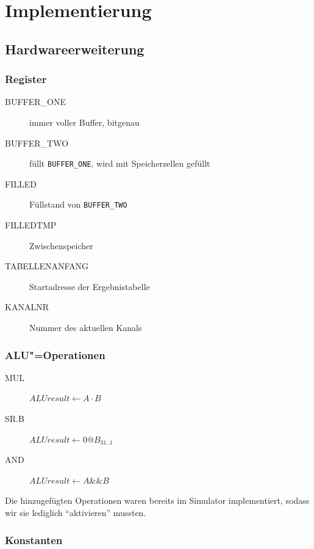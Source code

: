 \chapter{Implementierung}
\label{chapter:Dokumentation-Implementierung}

\section{Hardwareerweiterung}
\label{section:Dokumentation-Implementierung-Hardwareerweiterung}

\subsection{Register}
\label{subsection:Dokumentation-Implementierung-Hardwareerweiterung-Register}

\begin{description}
    \item[BUFFER\_ONE] immer voller Buffer, bitgenau
    \item[BUFFER\_TWO] füllt \texttt{BUFFER\_ONE}, wird mit Speicherzellen gefüllt
    \item[FILLED] Füllstand von \texttt{BUFFER\_TWO}
    \item[FILLEDTMP] Zwischenspeicher
    \item[TABELLENANFANG] Startadresse der Ergebnistabelle
    \item[KANALNR] Nummer des aktuellen Kanals
\end{description}

\subsection{ALU"=Operationen}
\label{subsection:Dokumentation-Implementierung-Hardwareerweiterung-AluOps}

\begin{description}
    \item[MUL] $ALUresult \gets A \cdot B$
    \item[SR.B] $ALUresult \gets 0@B_{31..1}$
    \item[AND] $ALUresult \gets A \&\& B$
\end{description}

Die hinzugefügten Operationen waren bereits im Simulator implementiert, sodass wir sie lediglich "`aktivieren"' mussten.

\subsection{Konstanten}
\label{subsection:Dokumentation-Implementierung-Hardwareerweiterung-Konstanten}

